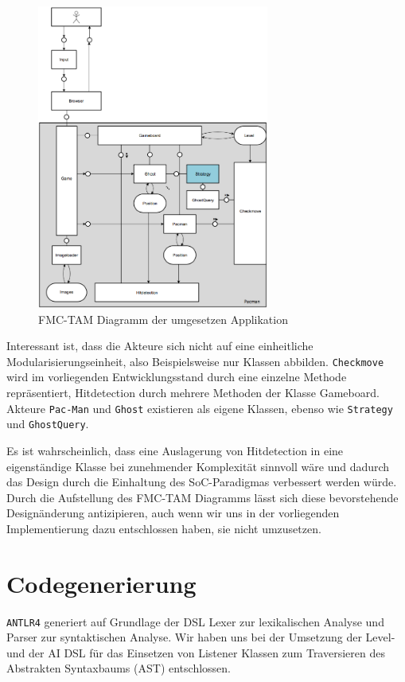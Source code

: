 \documentclass[conference]{IEEEtran}
\begin{document}
\begin{figure}[!t]
\centering
\includegraphics[width=3.0in]{tam.png}

\caption{FMC-TAM Diagramm der umgesetzen Applikation}
\label{fmc_tam}
\end{figure}

Interessant ist, dass die Akteure sich nicht auf eine einheitliche Modularisierungseinheit, also Beispielsweise nur Klassen abbilden. \texttt{Checkmove} wird im vorliegenden Entwicklungsstand durch eine einzelne Methode repräsentiert, Hitdetection durch mehrere Methoden der Klasse Gameboard. Akteure \texttt{Pac-Man} und \texttt{Ghost} existieren als eigene Klassen, ebenso wie \texttt{Strategy} und \texttt{GhostQuery}.

Es ist wahrscheinlich, dass eine Auslagerung von Hitdetection in eine eigenständige Klasse bei zunehmender Komplexität sinnvoll wäre und dadurch das Design durch die Einhaltung des SoC-Paradigmas verbessert werden würde. Durch die Aufstellung des FMC-TAM Diagramms lässt sich diese bevorstehende Designänderung antizipieren, auch wenn wir uns in der vorliegenden Implementierung dazu entschlossen haben, sie nicht umzusetzen.

\section{Codegenerierung}
\texttt{ANTLR4} generiert auf Grundlage der DSL Lexer zur lexikalischen Analyse und Parser zur syntaktischen Analyse.
Wir haben uns bei der Umsetzung der Level- und der AI DSL für  das Einsetzen von Listener Klassen zum Traversieren des Abstrakten Syntaxbaums (AST) entschlossen.
\end{document}
